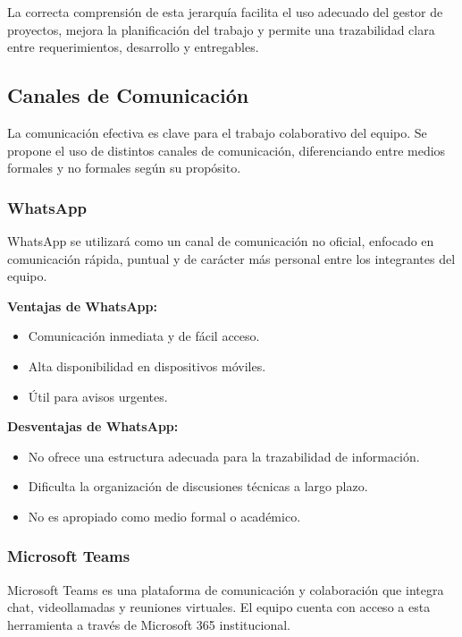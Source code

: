 \documentclass[12pt]{article}
\begin{document}
La correcta comprensión de esta jerarquía facilita el uso adecuado del gestor de proyectos, mejora la planificación del trabajo y permite una trazabilidad clara entre requerimientos, desarrollo y entregables.


\subsection{Canales de Comunicación}

La comunicación efectiva es clave para el trabajo colaborativo del equipo. Se propone el uso de distintos canales de comunicación, diferenciando entre medios formales y no formales según su propósito.



\subsubsection{WhatsApp}

WhatsApp se utilizará como un canal de comunicación no oficial, enfocado en comunicación rápida, puntual y de carácter más personal entre los integrantes del equipo.

\textbf{Ventajas de WhatsApp:}
\begin{itemize}
    \item Comunicación inmediata y de fácil acceso.
    \item Alta disponibilidad en dispositivos móviles.
    \item Útil para avisos urgentes.
\end{itemize}

\textbf{Desventajas de WhatsApp:}
\begin{itemize}
    \item No ofrece una estructura adecuada para la trazabilidad de información.
    \item Dificulta la organización de discusiones técnicas a largo plazo.
    \item No es apropiado como medio formal o académico.
\end{itemize}

\subsubsection{Microsoft Teams}

Microsoft Teams es una plataforma de comunicación y colaboración que integra chat, videollamadas y reuniones virtuales. El equipo cuenta con acceso a esta herramienta a través de Microsoft 365 institucional.
\end{document}
